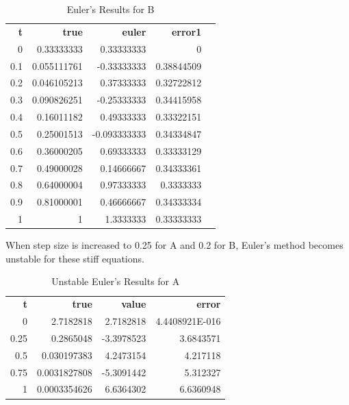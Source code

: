 \documentclass{article}
\begin{document}
\begin{table}
\footnotesize
\centering
\caption{Euler's Results for B}
\label{tab:b_euler}
\begin{tabular}{rrrrl}
\textbf{t} & \textbf{true} & \textbf{euler} & \textbf{error1} &  \\
0          & 0.33333333    & 0.33333333     & 0               &  \\
0.1        & 0.055111761   & -0.33333333    & 0.38844509      &  \\
0.2        & 0.046105213   & 0.37333333     & 0.32722812      &  \\
0.3        & 0.090826251   & -0.25333333    & 0.34415958      &  \\
0.4        & 0.16011182    & 0.49333333     & 0.33322151      &  \\
0.5        & 0.25001513    & -0.093333333   & 0.34334847      &  \\
0.6        & 0.36000205    & 0.69333333     & 0.33333129      &  \\
0.7        & 0.49000028    & 0.14666667     & 0.34333361      &  \\
0.8        & 0.64000004    & 0.97333333     & 0.3333333       &  \\
0.9        & 0.81000001    & 0.46666667     & 0.34333334      &  \\
1          & 1             & 1.3333333      & 0.33333333      & 
\end{tabular}
\end{table}

When step size is increased to 0.25 for A and 0.2 for B, Euler's method becomes unstable for these stiff equations.

\begin{table}
\footnotesize
\centering
\caption{Unstable Euler's Results for A}
\label{tab:un_a_euler}
\begin{tabular}{rrrr}
\textbf{t} & \textbf{true} & \textbf{value} & \textbf{error} \\
0          & 2.7182818     & 2.7182818      & 4.4408921E-016 \\
0.25       & 0.2865048     & -3.3978523     & 3.6843571      \\
0.5        & 0.030197383   & 4.2473154      & 4.217118       \\
0.75       & 0.0031827808  & -5.3091442     & 5.312327       \\
1          & 0.0003354626  & 6.6364302      & 6.6360948         
\end{tabular}
\end{table}
\end{document}
